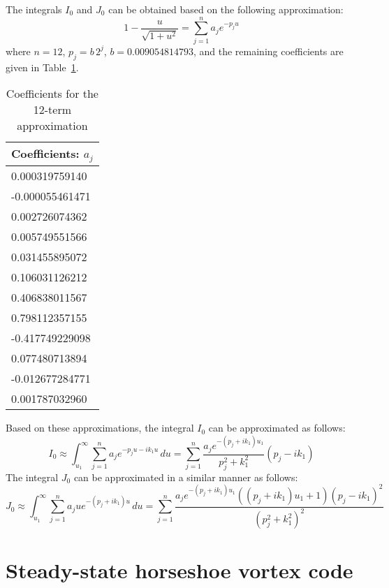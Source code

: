 \documentclass[12pt]{article}
\newcommand{\f}{\frac}
\begin{document}
The integrals $I_{0}$ and $J_{0}$ can be obtained based on the
following approximation:
%
\begin{equation*}
  1 - \f{u}{\sqrt{1 + u^{2}}} = \sum_{j=1}^{n} a_{j} e^{-p_{j}u}
\end{equation*}
%
where $n = 12$, $p_{j} = b\,2^{j}$, $b = 0.009054814793$, and the
remaining coefficients are given in Table~\ref{table:a-coef}.
%
\begin{table}[h]
  \begin{center}
    \begin{tabular}{l}
      \toprule
      Coefficients: $a_{j}$ \\
      \midrule
      0.000319759140 \\
      -0.000055461471 \\
      0.002726074362 \\
      0.005749551566 \\
      0.031455895072 \\
      0.106031126212 \\
      0.406838011567 \\
      0.798112357155 \\
      -0.417749229098 \\
      0.077480713894 \\
      -0.012677284771 \\
      0.001787032960 \\
      \bottomrule
    \end{tabular}
  \end{center}
  \caption{Coefficients for the 12-term approximation}
  \label{table:a-coef}
\end{table}

Based on these approximations, the integral $I_{0}$ can be
approximated as follows:
%
\begin{equation*}
  I_{0} \approx \int_{u_{1}}^{\infty} \sum_{j=1}^{n} a_{j} e^{-p_{j}u - ik_{1}u} \, du 
  = \sum_{j=1}^{n} \f{a_{j}e^{-(p_{j} + i k_{1})u_{1}}}{p_{j}^2 + k_{1}^2} (p_{j} - i k_1)
\end{equation*}
%
The integral $J_{0}$ can be approximated in a similar manner as
follows:
%
\begin{equation*}
  J_{0} \approx \int_{u_{1}}^{\infty} \sum_{j=1}^{n} a_{j} u e^{-(p_{j} + ik_{1})u} \, du 
  = \sum_{j=1}^{n} \f{a_{j}e^{-(p_{j} + i k_{1})u_{1}}((p_{j} + i k_1)u_{1} + 1)(p_{j} - ik_{1})^2}{(p_{j}^2 + k_{1}^2)^2}
\end{equation*}

\section{Steady-state horseshoe vortex code}
\end{document}
